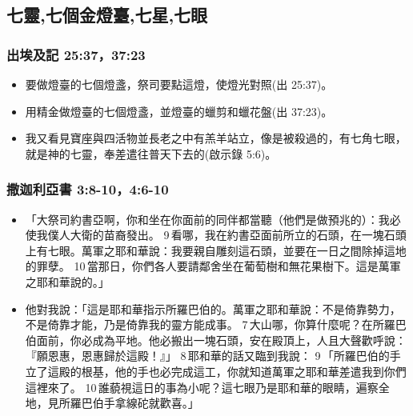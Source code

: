 



\subsection{七靈,七個金燈臺,七星,七眼}
\subsubsection{出埃及記 25:37，37:23}
\begin{itemize} 
\itemsep-.25em
\item 要做燈臺的七個燈盞，祭司要點這燈，使燈光對照(出 25:37)。
\item 用精金做燈臺的七個燈盞，並燈臺的蠟剪和蠟花盤(出 37:23)。
\item 我又看見寶座與四活物並長老之中有羔羊站立，像是被殺過的，有七角七眼，就是神的七靈，奉差遣往普天下去的(啟示錄 5:6)。
\end{itemize} 

\subsubsection{撒迦利亞書 3:8-10，4:6-10}
\begin{itemize} 
\itemsep-.25em
\item 「大祭司約書亞啊，你和坐在你面前的同伴都當聽（他們是做預兆的）：我必使我僕人大衛的苗裔發出。 9 看哪，我在約書亞面前所立的石頭，在一塊石頭上有七眼。萬軍之耶和華說：我要親自雕刻這石頭，並要在一日之間除掉這地的罪孽。 10 當那日，你們各人要請鄰舍坐在葡萄樹和無花果樹下。這是萬軍之耶和華說的。」
\item 他對我說：「這是耶和華指示所羅巴伯的。萬軍之耶和華說：不是倚靠勢力，不是倚靠才能，乃是倚靠我的靈方能成事。 7 大山哪，你算什麼呢？在所羅巴伯面前，你必成為平地。他必搬出一塊石頭，安在殿頂上，人且大聲歡呼說：『願恩惠，恩惠歸於這殿！』」 8 耶和華的話又臨到我說： 9 「所羅巴伯的手立了這殿的根基，他的手也必完成這工，你就知道萬軍之耶和華差遣我到你們這裡來了。 10 誰藐視這日的事為小呢？這七眼乃是耶和華的眼睛，遍察全地，見所羅巴伯手拿線砣就歡喜。」
\end{itemize} 

